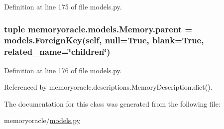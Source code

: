 Definition at line 175 of file models.\+py.

\hypertarget{classmemoryoracle_1_1models_1_1Memory_a1b2b143c63aea58df9c28c7016425f24}{}
\subsubsection[{parent}]{\setlength{\rightskip}{0pt plus 5cm}tuple memoryoracle.\+models.\+Memory.\+parent = models.\+Foreign\+Key(\textquotesingle{}self\textquotesingle{}, null=True, blank=True, related\+\_\+name=\char`\"{}children\char`\"{})\hspace{0.3cm}{\ttfamily [static]}}\label{classmemoryoracle_1_1models_1_1Memory_a1b2b143c63aea58df9c28c7016425f24}


Definition at line 176 of file models.\+py.



Referenced by memoryoracle.\+descriptions.\+Memory\+Description.\+dict().



The documentation for this class was generated from the following file\+:\begin{DoxyCompactItemize}
\item 
memoryoracle/\hyperlink{models_8py}{models.\+py}\end{DoxyCompactItemize}
